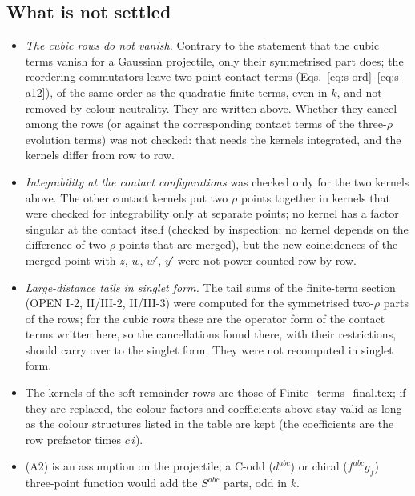 \subsection{What is not settled}
\begin{itemize}
\item[(1)] \emph{The cubic rows do not vanish.} Contrary to the statement that the cubic terms vanish for a Gaussian projectile, only their symmetrised part does; the reordering commutators leave two-point contact terms (Eqs.~\eqref{eq:s-ord}--\eqref{eq:s-a12}), of the same order as the quadratic finite terms, even in $k$, and not removed by colour neutrality. They are written above. Whether they cancel among the rows (or against the corresponding contact terms of the three-$\rho$ evolution terms) was not checked: that needs the kernels integrated, and the kernels differ from row to row.
\item[(2)] \emph{Integrability at the contact configurations} was checked only for the two kernels above. The other contact kernels put two $\rho$ points together in kernels that were checked for integrability only at separate points; no kernel has a factor singular at the contact itself (checked by inspection: no kernel depends on the difference of two $\rho$ points that are merged), but the new coincidences of the merged point with $z$, $w$, $w'$, $y'$ were not power-counted row by row.
\item[(3)] \emph{Large-distance tails in singlet form.} The tail sums of the finite-term section (OPEN I-2, II/III-2, II/III-3) were computed for the symmetrised two-$\rho$ parts of the rows; for the cubic rows these are the operator form of the contact terms written here, so the cancellations found there, with their restrictions, should carry over to the singlet form. They were not recomputed in singlet form.
\item[(4)] The kernels of the soft-remainder rows are those of Finite\_terms\_final.tex; if they are replaced, the colour factors and coefficients above stay valid as long as the colour structures listed in the table are kept (the coefficients are the row prefactor times $c\,i$).
\item[(5)] (A2) is an assumption on the projectile; a C-odd ($d^{abc}$) or chiral ($f^{abc}g_{f}$) three-point function would add the $S^{abc}$ parts, odd in $k$.
\end{itemize}
